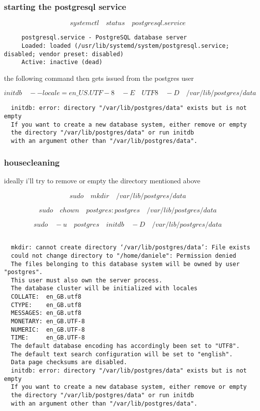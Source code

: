 \documentclass[a4paper,12pt]{article}
\begin{document}
\subsubsection{starting the postgresql service}
\[ systemctl \quad status \quad postgresql.service \]

\begin{lstlisting}
     postgresql.service - PostgreSQL database server  
     Loaded: loaded (/usr/lib/systemd/system/postgresql.service; disabled; vendor preset: disabled)  
     Active: inactive (dead)   
\end{lstlisting}


the following command then gets issued from the postgres user

\[ initdb \quad --locale=en\_US.UTF-8 \quad -E \quad UTF8 \quad -D \quad /var/lib/postgres/data \]

\begin{lstlisting}
  initdb: error: directory "/var/lib/postgres/data" exists but is not empty   
  If you want to create a new database system, either remove or empty   
  the directory "/var/lib/postgres/data" or run initdb   
  with an argument other than "/var/lib/postgres/data".   
\end{lstlisting}

\subsubsection{ housecleaning }

ideally i'll try to remove or empty the directory mentioned above

\[sudo \quad mkdir \quad /var/lib/postgres/data \]

\[sudo \quad chown \quad postgres:postgres \quad /var/lib/postgres/data \] 

\[sudo \quad -u \quad postgres \quad initdb \quad -D \quad /var/lib/postgres/data \]


\begin{lstlisting}

  mkdir: cannot create directory ‘/var/lib/postgres/data’: File exists   
  could not change directory to "/home/daniele": Permission denied   
  The files belonging to this database system will be owned by user "postgres".   
  This user must also own the server process.   
  The database cluster will be initialized with locales   
  COLLATE:  en_GB.utf8  
  CTYPE:    en_GB.utf8  
  MESSAGES: en_GB.utf8  
  MONETARY: en_GB.UTF-8  
  NUMERIC:  en_GB.UTF-8  
  TIME:     en_GB.UTF-8  
  The default database encoding has accordingly been set to "UTF8".  
  The default text search configuration will be set to "english".   
  Data page checksums are disabled.   
  initdb: error: directory "/var/lib/postgres/data" exists but is not empty  
  If you want to create a new database system, either remove or empty   
  the directory "/var/lib/postgres/data" or run initdb   
  with an argument other than "/var/lib/postgres/data".   
\end{lstlisting}
\end{document}
